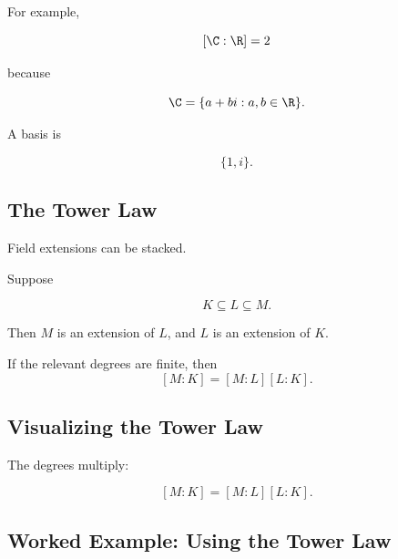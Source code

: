 For example,

\[ [\C:\R]=2 \]

because

\[ \C=\{a+bi:a,b\in\R\}. \]

A basis is

\[ \{1,i\}. \]

\subsection{The Tower Law}
\label{subsec:tower-law}

Field extensions can be stacked.

Suppose

\[ K\subseteq L\subseteq M. \]

Then \(M\) is an extension of \(L\), and \(L\) is an extension of \(K\).

\begin{theorem}
If the relevant degrees are finite, then
\[ [M:K]=[M:L][L:K]. \]
\end{theorem}

\subsection{Visualizing the Tower Law}
\label{subsec:visual-tower-law}

\begin{center}
\end{center}

The degrees multiply:

\[ [M:K]=[M:L][L:K]. \]

\subsection{Worked Example: Using the Tower Law}
\label{subsec:worked-tower-law}

